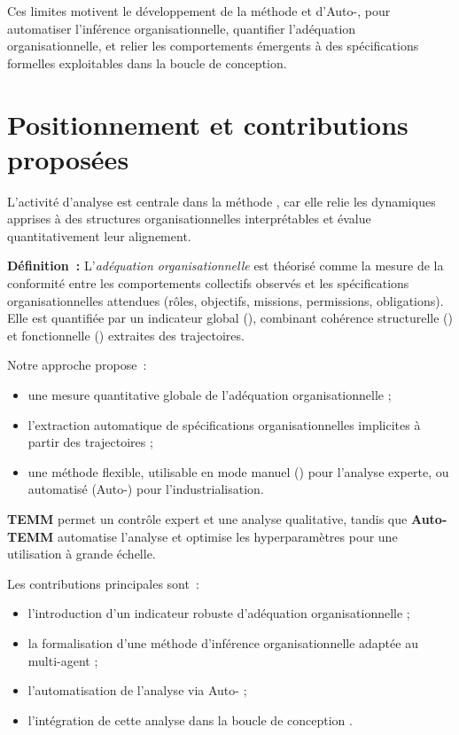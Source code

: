Ces limites motivent le développement de la méthode  et d'Auto-, pour automatiser l'inférence organisationnelle, quantifier l'adéquation organisationnelle, et relier les comportements émergents à des spécifications formelles exploitables dans la boucle de conception.



\section{Positionnement et contributions proposées}
L'activité d'analyse est centrale dans la méthode , car elle relie les dynamiques apprises à des structures organisationnelles interprétables et évalue quantitativement leur alignement.

\textbf{Définition~:} L'\textit{adéquation organisationnelle} est théorisé comme la mesure de la conformité entre les comportements collectifs observés et les spécifications organisationnelles attendues (rôles, objectifs, missions, permissions, obligations). Elle est quantifiée par un indicateur global (\textbf{}), combinant cohérence structurelle () et fonctionnelle () extraites des trajectoires.

Notre approche propose~:
\begin{itemize}
  \item une mesure quantitative globale de l'adéquation organisationnelle  ;
  \item l'extraction automatique de spécifications organisationnelles implicites à partir des trajectoires ;
  \item une méthode flexible, utilisable en mode manuel () pour l'analyse experte, ou automatisé (Auto-) pour l'industrialisation.
\end{itemize}

\textbf{TEMM} permet un contrôle expert et une analyse qualitative, tandis que \textbf{Auto-TEMM} automatise l'analyse et optimise les hyperparamètres pour une utilisation à grande échelle.

Les contributions principales sont~:
\begin{itemize}
  \item l'introduction d'un indicateur robuste d'adéquation organisationnelle ;
  \item la formalisation d'une méthode d'inférence organisationnelle adaptée au multi-agent ;
  \item l'automatisation de l'analyse via Auto- ;
  \item l'intégration de cette analyse dans la boucle de conception .
\end{itemize}

